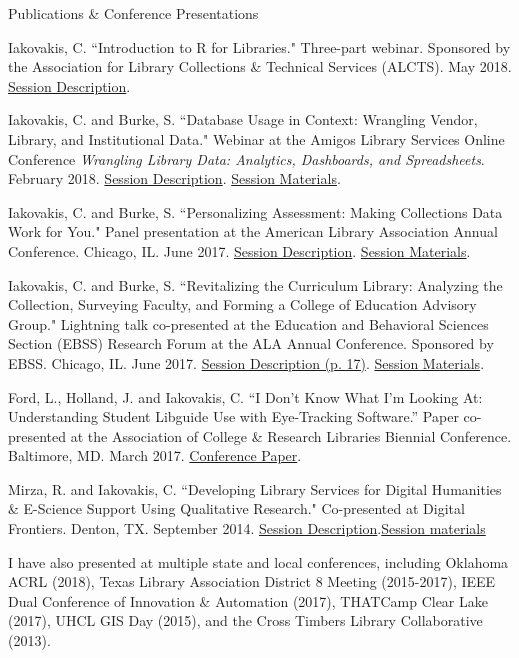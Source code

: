 \documentclass{resume} %
\begin{document}
\begin{rSection}{Publications \& Conference Presentations}
\begin{rSubsectionConf}{2em}
Iakovakis, C. ``Introduction to R for Libraries." Three-part webinar. Sponsored by the Association for Library Collections \& Technical Services (ALCTS). May 2018. \href{http://www.ala.org/alcts/confevents/upcoming/webinar/IntrotoR}{Session Description}.

Iakovakis, C. and Burke, S. ``Database Usage in Context: Wrangling Vendor, Library, and Institutional Data." Webinar at the Amigos Library Services Online Conference \textit{Wrangling Library Data: Analytics, Dashboards, and Spreadsheets}. February 2018. \href{http://www.amigos.org/wrangling_data}{Session Description}. \href{http://uhcl.libguides.com/alcts/amigos}{Session Materials}.

Iakovakis, C. and Burke, S. ``Personalizing Assessment: Making Collections Data Work for You." Panel presentation at the American Library Association Annual Conference.  Chicago, IL. June 2017. \href{https://alcts.ala.org/news/2017/ac-personalizing-assessment/}{Session Description}. \href{http://uhcl.libguides.com/alcts}{Session Materials}.

Iakovakis, C. and Burke, S. ``Revitalizing the Curriculum Library: Analyzing the Collection, Surveying Faculty, and Forming a College of Education Advisory Group." Lightning talk co-presented at the Education and Behavioral Sciences Section (EBSS) Research Forum at the ALA Annual Conference. Sponsored by EBSS. Chicago, IL. June 2017. \href{http://www.ala.org/acrl/sites/ala.org.acrl/files/content/aboutacrl/directoryofleadership/sections/ebss/ebsswebsite/ebssnewsletter/ebss_fall2017.pdf}{Session Description (p. 17)}. \href{http://www.ala.org/acrl/aboutacrl/directoryofleadership/sections/ebss/ebsswebsite/poster-forum}{Session Materials}. 

Ford, L., Holland, J. and Iakovakis, C. ``I Don’t Know What I’m Looking At: Understanding Student Libguide Use with Eye-Tracking Software.” Paper co-presented at the Association of College \& Research Libraries Biennial Conference. Baltimore, MD. March 2017. \href{http://www.ala.org/acrl/sites/ala.org.acrl/files/content/conferences/confsandpreconfs/2017/IDontKnowWhatImLookingat.pdf}{Conference Paper}.

Mirza, R. and Iakovakis, C. ``Developing Library Services for Digital Humanities \& E-Science Support Using Qualitative Research." Co-presented at Digital Frontiers. Denton, TX. September 2014. \href{https://rafiamirzasite.wordpress.com/2016/03/13/developing-library-services-for-digital-humanities/}{Session Description}.\href{https://www.slideshare.net/librarianrafia/digital-frontiers-2014}{Session materials}
\end{rSubsectionConf}

I have also presented at multiple state and local conferences, including Oklahoma ACRL (2018), Texas Library Association District 8 Meeting (2015-2017), IEEE Dual Conference of Innovation \& Automation (2017), THATCamp Clear Lake (2017), UHCL GIS Day (2015), and the Cross Timbers Library Collaborative (2013).


\end{rSection}
\end{document}
